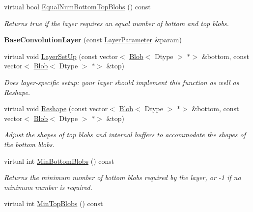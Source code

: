 \begin{DoxyCompactItemize}
virtual bool \mbox{\hyperlink{classcaffe_1_1_base_convolution_layer_ad8e839460bf52abe3df2008b99a1810d}{Equal\+Num\+Bottom\+Top\+Blobs}} () const
\begin{DoxyCompactList}\small\item\em Returns true if the layer requires an equal number of bottom and top blobs. \end{DoxyCompactList}\item 
\mbox{\label{classcaffe_1_1_base_convolution_layer_a42f9ea86a8ede098bda11f582a31ffc1}} 
{\bfseries Base\+Convolution\+Layer} (const \mbox{\hyperlink{classcaffe_1_1_layer_parameter}{Layer\+Parameter}} \&param)
\item 
virtual void \mbox{\hyperlink{classcaffe_1_1_base_convolution_layer_a1527055aae7f9b74a7a82f680957162c}{Layer\+Set\+Up}} (const vector$<$ \mbox{\hyperlink{classcaffe_1_1_blob}{Blob}}$<$ Dtype $>$ $\ast$$>$ \&bottom, const vector$<$ \mbox{\hyperlink{classcaffe_1_1_blob}{Blob}}$<$ Dtype $>$ $\ast$$>$ \&top)
\begin{DoxyCompactList}\small\item\em Does layer-\/specific setup\+: your layer should implement this function as well as Reshape. \end{DoxyCompactList}\item 
virtual void \mbox{\hyperlink{classcaffe_1_1_base_convolution_layer_af384650d31552ea10b1a030788cb52d8}{Reshape}} (const vector$<$ \mbox{\hyperlink{classcaffe_1_1_blob}{Blob}}$<$ Dtype $>$ $\ast$$>$ \&bottom, const vector$<$ \mbox{\hyperlink{classcaffe_1_1_blob}{Blob}}$<$ Dtype $>$ $\ast$$>$ \&top)
\begin{DoxyCompactList}\small\item\em Adjust the shapes of top blobs and internal buffers to accommodate the shapes of the bottom blobs. \end{DoxyCompactList}\item 
virtual int \mbox{\hyperlink{classcaffe_1_1_base_convolution_layer_aa3d861ed15f6e41c6257d6a10defa7eb}{Min\+Bottom\+Blobs}} () const
\begin{DoxyCompactList}\small\item\em Returns the minimum number of bottom blobs required by the layer, or -\/1 if no minimum number is required. \end{DoxyCompactList}\item 
virtual int \mbox{\hyperlink{classcaffe_1_1_base_convolution_layer_ae4092cf1b48e18e5d82cd714ae6e8547}{Min\+Top\+Blobs}} () const

\end{DoxyCompactItemize}
